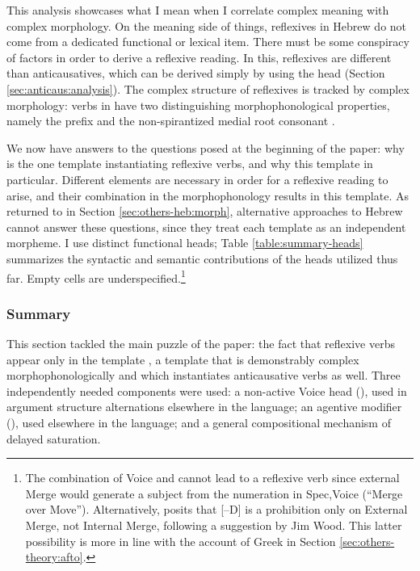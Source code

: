 This analysis showcases what I mean when I correlate complex meaning with complex morphology. On the meaning side of things, reflexives in Hebrew do not come from a dedicated functional or lexical item. There must be some conspiracy of factors in order to derive a reflexive reading. In this, reflexives are different than anticausatives, which can be derived simply by using the head {\vz} (Section \ref{sec:anticaus:analysis}). The complex structure of reflexives is tracked by complex morphology: verbs in {\thit} have two distinguishing morphophonological properties, namely the prefix and the non-spirantized medial root consonant .

We now have answers to the questions posed at the beginning of the paper: why {\thit} is the one template instantiating reflexive verbs, and why this template in particular. Different elements are necessary in order for a reflexive reading to arise, and their combination in the morphophonology results in this template. As returned to in Section \ref{sec:others-heb:morph}, alternative approaches to Hebrew cannot answer these questions, since they treat each template as an independent morpheme. I use distinct functional heads; Table \ref{table:summary-heads} summarizes the syntactic and semantic contributions of the heads utilized thus far.  Empty cells are underspecified.\footnote{The combination of Voice and {\va} cannot lead to a reflexive verb since external Merge would generate a subject from the numeration in Spec,Voice (``Merge over Move''). Alternatively, \cite{oseki17nyu} posits that [--D] is a prohibition only on External Merge, not Internal Merge, following a suggestion by Jim Wood. This latter possibility is more in line with the account of Greek in Section \ref{sec:others-theory:afto}.}



	\subsubsection{Summary}
This section tackled the main puzzle of the paper: the fact that reflexive verbs appear only in the template {\thit}, a template that is demonstrably complex morphophonologically and which instantiates anticausative verbs as well. Three independently needed components were used: a non-active Voice head (\vz), used in argument structure alternations elsewhere in the language; an agentive modifier (\va), used elsewhere in the language; and a general compositional mechanism of delayed saturation.

